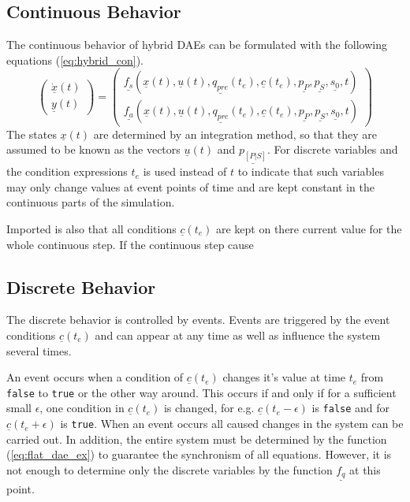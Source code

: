 \subsection{Continuous Behavior}

The continuous behavior of hybrid DAEs can be formulated with the
following equations (\ref{eq:hybrid_con}). 
\begin{equation} \label{eq:hybrid_con}
\left (    \begin{array}{c}
		     \underline{\dot x}(t) \\
		     \underline{y}(t)
		   \end{array} \right) =
			\left( \begin{array}{c}
			\underline{f_s}(\underline{x}(t),
			 	\underline{u}(t),
			 	\underline{q_{pre}}(t_e),
			 	\underline{c}(t_e),
				\underline{p_{P}},
				\underline{p_{S}},
				\underline{s_0},
			 	t) \\
			\underline{f_a}(\underline{x}(t),
			 	\underline{u}(t),
			 	\underline{q_{pre}}(t_e),
			 	\underline{c}(t_e),
			 	\underline{p_{P}},
				\underline{p_{S}},
				\underline{s_0},
			 	t)
		 \end{array} \right)
\end{equation}
The states $\underline{x}(t)$ are determined by an integration method, so that
they are assumed to be known as the vectors $\underline{u}(t)$ and
$\underline{p_{[P|S]}}$. 
For discrete variables and the condition expressions $t_e$ is used instead of
$t$ to indicate that such variables may only change values at event points of
time and are kept constant in the continuous parts of the simulation.

Imported is also that all conditions $\underline{c}(t_e)$ are kept on there
current value for the whole continuous step. If the continuous step cause   

\subsection{Discrete Behavior}

The discrete behavior is controlled by events. Events are triggered by the
event conditions $\underline{c}(t_e)$ and can appear at any time
as well as influence the system several times.

An event occurs when a condition of $\underline{c}(t_e)$ changes it's value at
time $t_e$ from \verb+false+ to \verb+true+ or the other way around. 
This occurs if and only if for a sufficient small $\epsilon$, one condition in
$\underline{c}(t_e)$ is changed, for e.g. $\underline{c}(t_e - \epsilon)$ is
\verb+false+ and for $\underline{c}(t_e + \epsilon)$ is \verb+true+. When an event
occurs all caused changes in the system can be carried out. In addition, the
entire system must be determined by the function (\ref{eq:flat_dae_ex}) to
guarantee the synchronism of all equations. However, it is not enough to
determine only the discrete variables by the function $\underline{f_q}$ at
this point.

